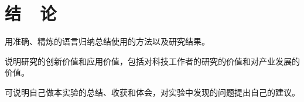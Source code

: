 \documentclass{thuemp}
\begin{document}
\section{结~~论}
用准确、精炼的语言归纳总结使用的方法以及研究结果。

说明研究的创新价值和应用价值，包括对科技工作者的研究的价值和对产业发展的价值。

可说明自己做本实验的总结、收获和体会，对实验中发现的问题提出自己的建议。



\renewcommand\refname{\heiti\wuhao\centerline{参考文献}\global\def\refname{参考文献}}
\vskip 12pt

\let\OLDthebibliography\thebibliography

{
\renewcommand{\baselinestretch}{0.9}
\liuhao


}
\end{document}
